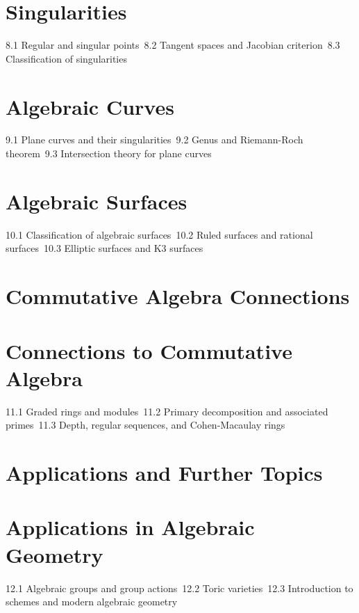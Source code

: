 \section{Singularities}
8.1 Regular and singular points\
8.2 Tangent spaces and Jacobian criterion\
8.3 Classification of singularities\
\section{Algebraic Curves}
9.1 Plane curves and their singularities\
9.2 Genus and Riemann-Roch theorem\
9.3 Intersection theory for plane curves\
\section{Algebraic Surfaces}
10.1 Classification of algebraic surfaces\
10.2 Ruled surfaces and rational surfaces\
10.3 Elliptic surfaces and K3 surfaces\
\section{Commutative Algebra Connections}
\section{Connections to Commutative Algebra}
11.1 Graded rings and modules\
11.2 Primary decomposition and associated primes\
11.3 Depth, regular sequences, and Cohen-Macaulay rings\
\section{Applications and Further Topics}
\section{Applications in Algebraic Geometry}
12.1 Algebraic groups and group actions\
12.2 Toric varieties\
12.3 Introduction to schemes and modern algebraic geometry\
